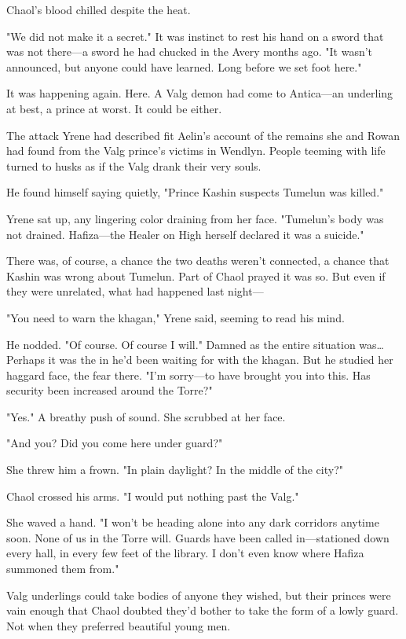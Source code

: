 Chaol's blood chilled despite the heat.

"We did not make it a secret."
It was instinct to rest his hand on a sword that was not there---a sword he had chucked in the Avery months ago.
"It wasn't announced, but anyone could have learned.
Long before we set foot here."

It was happening again.
Here.
A Valg demon had come to Antica---an underling at best, a prince at worst.
It could be either.

The attack Yrene had described fit Aelin's account of the remains she and Rowan had found from the Valg prince's victims in Wendlyn.
People teeming with life turned to husks as if the Valg drank their very souls.

He found himself saying quietly, "Prince Kashin suspects Tumelun was killed."

Yrene sat up, any lingering color draining from her face.
"Tumelun's body was not drained.
Hafiza---the Healer on High herself declared it was a suicide."

There was, of course, a chance the two deaths weren't connected, a chance that Kashin was wrong about Tumelun.
Part of Chaol prayed it was so.
But even if they were unrelated, what had happened last night---

"You need to warn the khagan," Yrene said, seeming to read his mind.

He nodded.
"Of course.
Of course I will."
Damned as the entire situation was\ldots Perhaps it was the in he'd been waiting for with the khagan.
But he studied her haggard face, the fear there.
"I'm sorry---to have brought you into this.
Has security been increased around the Torre?"

"Yes."
A breathy push of sound.
She scrubbed at her face.

"And you?
Did you come here under guard?"

She threw him a frown.
"In plain daylight?
In the middle of the city?"

Chaol crossed his arms.
"I would put nothing past the Valg."

She waved a hand.
"I won't be heading alone into any dark corridors anytime soon.
None of us in the Torre will.
Guards have been called in---stationed down every hall, in every few feet of the library.
I don't even know where Hafiza summoned them from."

Valg underlings could take bodies of anyone they wished, but their princes were vain enough that Chaol doubted they'd bother to take the form of a lowly guard.
Not when they preferred beautiful young men.

